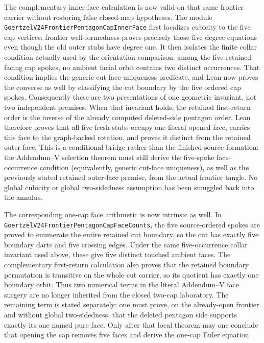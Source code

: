 \documentclass[11pt]{article}
\theoremstyle{definition}
\begin{document}
The complementary inner-face calculation is now valid on that same frontier
carrier without restoring false closed-map hypotheses.  The module
\texttt{GoertzelV24FrontierPentagonCapInnerFace} first localizes cubicity to
the five cap vertices; frontier well-formedness proves precisely those five
degree equations even though the old outer stubs have degree one.  It then
isolates the finite collar condition actually used by the orientation
comparison: among the five retained-facing cap spokes, no ambient facial orbit
contains two distinct occurrences.  That condition implies the generic
cut-face uniqueness predicate, and Lean now proves the converse as well by
classifying the cut boundary by the five ordered cap spokes.  Consequently
these are two presentations of one geometric invariant, not two independent
premises.  When that invariant holds, the retained first-return order is the
inverse of the already computed deleted-side pentagon order.  Lean therefore
proves that all five fresh stubs occupy one literal opened face, carries this
face to the graph-backed rotation, and proves it distinct from the retained
outer face.  This is a conditional bridge rather than the finished source
formation: the Addendum--V selection theorem must still derive the five-spoke
face-occurrence condition (equivalently, generic cut-face uniqueness), as well
as the previously stated retained
outer-face premise, from the actual frontier tangle.  No global cubicity or
global two-sidedness assumption has been smuggled back into the annulus.

The corresponding one-cap face arithmetic is now intrinsic as well.  In
\texttt{GoertzelV24FrontierPentagonCapFaceCounts}, the five source-ordered
spokes are proved to enumerate the entire retained cut boundary, so the cut
has exactly five boundary darts and five crossing edges.  Under the same
five-occurrence collar invariant used above, these give five distinct touched
ambient faces.  The complementary first-return calculation also proves that
the retained boundary permutation is transitive on the whole cut carrier, so
its quotient has exactly one boundary orbit.  Thus two numerical terms in the
literal Addendum--V face surgery are no longer inherited from the closed
two-cap laboratory.  The remaining term is stated separately: one must prove,
on the already-open frontier and without global two-sidedness, that the
deleted pentagon side supports exactly its one named pure face.  Only after
that local theorem may one conclude that opening the cap removes five faces
and derive the one-cap Euler equation.
\end{document}

